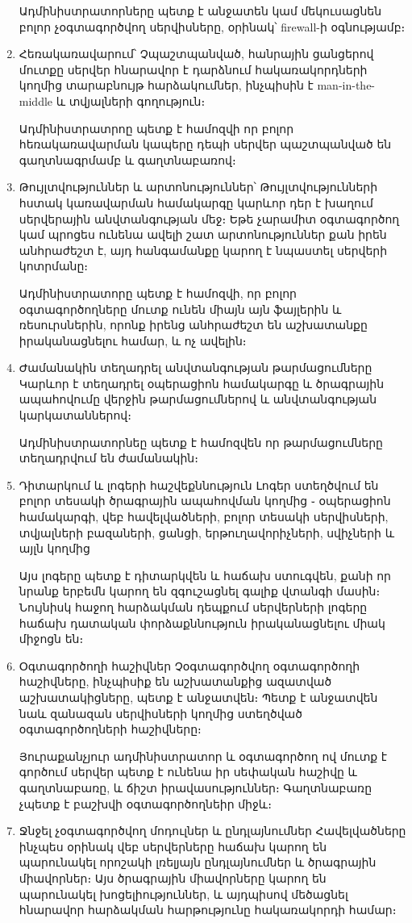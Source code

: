 \documentclass[10pt]{article}
\begin{document}
\begin{sloppypar}
\begin{enumerate}
    Ադմինիստրատորները պետք է անջատեն կամ մեկուսացնեն բոլոր չօգտագործվող
    սերվիսները, օրինակ՝ firewall-ի օգնությամբ։
\item Հեռակառավարում՝
    Չպաշտպանված, հանրային ցանցերով մուտքը սերվեր հնարավոր է դարձնում
    հակառակորդների կողմից տարաբնույթ հարձակումներ, ինչպիսին է
    man-in-the-middle և տվյալների գողություն։

    Ադմինիստրատրոը պետք է համոզվի որ բոլոր հեռակառավարման կապերը
    դեպի սերվեր պաշտպանված են գաղտնագրմամբ և գաղտնաբառով։
\item Թույլտվություններ և արտոնություններ՝
    Թույլտվությունների հստակ կառավարման համակարգը կարևոր դեր է խաղում
    սերվերային անվտանգության մեջ։ Եթե չարամիտ օգտագործող կամ պրոցես
    ունենա ավելի շատ արտոնություններ քան իրեն անհրաժեշտ է, այդ հանգամանքը
    կարող է նպաստել սերվերի կոտրմանը։

    Ադմինիստրատորը պետք է համոզվի, որ բոլոր օգտագործողները մուտք ունեն
    միայն այն ֆայլերին և ռեսուրսներին, որոնք իրենց անհրաժեշտ են
    աշխատանքը իրականացնելու համար, և ոչ ավելին։
\item Ժամանակին տեղադրել անվտանգության թարմացումները
    Կարևոր է տեղադրել օպերացիոն համակարգը և ծրագրային ապահովումը
    վերջին թարմացումներով և անվտանգության կարկատաններով։

    Ադմինիստրատորնեը պետք է համոզվեն որ թարմացումները տեղադրվում են
    ժամանակին։
\item Դիտարկում և լոգերի հաշվեքննություն
    Լոգեր ստեղծվում են բոլոր տեսակի ծրագրային ապահովման կողմից ֊
    օպերացիոն համակարգի, վեբ հավելվածների, բոլոր տեսակի սերվիսների,
    տվյալների բազաների, ցանցի, երթուղավորիչների, սվիչների և այլն կողմից

    Այս լոգերը պետք է դիտարկվեն և հաճախ ստուգվեն, քանի որ նրանք երբեմն
    կարող են զգուշացնել գալիք վտանգի մասին։ Նույնիսկ հաջող հարձակման
    դեպքում սերվերների լոգերը հաճախ դատական փորձաքննություն
    իրականացնելու միակ միջոցն են։
\item Օգտագործողի հաշիվներ
    Չօգտագործվող օգտագործողի հաշիվները, ինչպիսիք են աշխատանքից ազատված
    աշխատակիցները, պետք է անջատվեն։ Պետք է անջատվեն նաև զանազան
    սերվիսների կողմից ստեղծված օգտագործողների հաշիվները։

    Յուրաքանչյուր ադմինիստրատոր և օգտագործող ով մուտք է գործում
    սերվեր պետք է ունենա իր սեփական հաշիվը և գաղտնաբառը, և ճիշտ
    իրավասություններ։ Գաղտնաբառը չպետք է բաշխվի օգտագործողնեիր միջև։
\item Ջնջել չօգտագործվող մոդուլներ և ընդլայնումներ
    Հավելվածները ինչպես օրինակ վեբ սերվերները հաճախ կարող են պարունակել
    որոշակի լռելյայն ընդլայնումներ և ծրագրային միավորներ։
    Այս ծրագրային միավորները կարող են պարունակել խոցելիություններ, և
    այդպիսով մեծացնել հնարավոր հարձակման հարթությունը հակառակորդի համար։


\end{enumerate}
\end{sloppypar}
\end{document}
